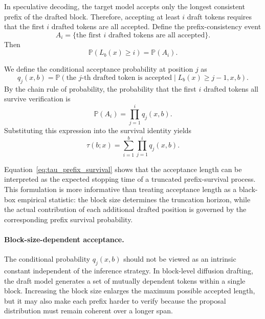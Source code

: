 \documentclass{llmxive}
\begin{document}
In speculative decoding, the target model accepts only the longest consistent prefix of the drafted block. Therefore, accepting at least $i$ draft tokens requires that the first $i$ drafted tokens are all accepted. Define the prefix-consistency event
\begin{equation}
A_i
=
\{\text{the first $i$ drafted tokens are all accepted}\}.
\end{equation}
Then
\begin{equation}
\mathbb{P}(L_b(x)\ge i)
=
\mathbb{P}(A_i).
\end{equation}

We define the conditional acceptance probability at position $j$ as
\begin{equation}
q_j(x,b)
=
\mathbb{P}
\left(
\text{the $j$-th drafted token is accepted}
\mid
L_b(x)\ge j-1, x, b
\right).
\end{equation}
By the chain rule of probability, the probability that the first $i$ drafted tokens all survive verification is
\begin{equation}
\mathbb{P}(A_i)
=
\prod_{j=1}^{i}
q_j(x,b).
\end{equation}
Substituting this expression into the survival identity yields
\begin{equation}
\label{eq:tau_prefix_survival}
\tau(b;x)
=
\sum_{i=1}^{b}
\prod_{j=1}^{i}
q_j(x,b).
\end{equation}

Equation~\eqref{eq:tau_prefix_survival} shows that the acceptance length can be interpreted as the expected stopping time of a truncated prefix-survival process. This formulation is more informative than treating acceptance length as a black-box empirical statistic: the block size determines the truncation horizon, while the actual contribution of each additional drafted position is governed by the corresponding prefix survival probability.

\paragraph{Block-size-dependent acceptance.}
The conditional probability $q_j(x,b)$ should not be viewed as an intrinsic constant independent of the inference strategy. In block-level diffusion drafting, the draft model generates a set of mutually dependent tokens within a single block. Increasing the block size enlarges the maximum possible accepted length, but it may also make each prefix harder to verify because the proposal distribution must remain coherent over a longer span.
\end{document}
